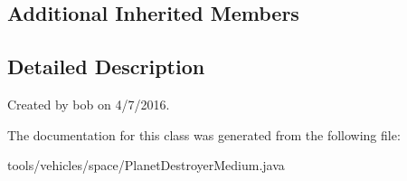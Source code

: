 \subsection*{Additional Inherited Members}


\subsection{Detailed Description}
Created by bob on 4/7/2016. 

The documentation for this class was generated from the following file\+:\begin{DoxyCompactItemize}
\item 
tools/vehicles/space/Planet\+Destroyer\+Medium.\+java\end{DoxyCompactItemize}
